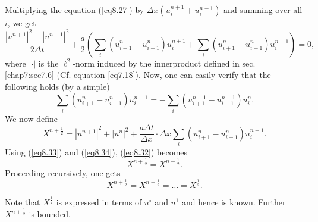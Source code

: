 Multiplying the equation (\ref{eq8.27}) by $\Delta x (u^{n+1}_i + u^{n-1}_i)$ and summing over all $i$, we get 
\begin{equation*}
\frac{|u^{n+1}|^2 - |u^{n-1}|^2}{2\Delta t} + \frac{a}{2}
\left(\sum\limits_i (u^n_{i+1} - u^n_{i-1}) u^{n+1}_i + \sum\limits_i
(u^n_{i+1} - u^n_{i-1}) u^{n-1}_i\right) = 0, \tag{8.32}\label{eq8.32} 
\end{equation*}
where $|\cdot |$ is the $\ell^2$-norm induced by the innerproduct defined in sec. \ref{chap7:sec7.6} (Cf. equation \ref{eq7.18}). Now, one can easily verify that the following holds (by a simple)
\begin{equation*}
\sum\limits_i (u^n_{i+1} - u^n_{i-1})u^{n-1}_i = - \sum\limits_i (u^{n-1}_{i+1} - u^{n-1}_{i-1}) u^n_i. \tag{8.33}\label{eq8.33}
\end{equation*}\pageoriginale
We now define
\begin{equation*}
X^{n+\frac{1}{2}} = |u^{n+1}|^2 + |u^n|^2 + \frac{a\Delta t}{\Delta x} \cdot \Delta x \sum\limits_i (u^n_{i+1} - u^n_{i-1}) u^{n+1}_i. \tag{8.34}\label{eq8.34}
\end{equation*}
Using (\ref{eq8.33}) and (\ref{eq8.34}), (\ref{eq8.32}) becomes
$$
X^{n+\frac{1}{2}} = X^{n-\frac{1}{2}}.
$$
Proceeding recursively, one gets
\begin{equation*}
X^{n+\frac{1}{2}} = X^{n-\frac{1}{2}} = \ldots = X^{\frac{1}{2}}. 
\tag{8.35}\label{eq8.35}
\end{equation*}

Note that $X^{\frac{1}{2}}$ is expressed in terms of $u^\circ$ and $u^1$ and hence is known. Further $X^{n+\frac{1}{2}}$ is bounded.

